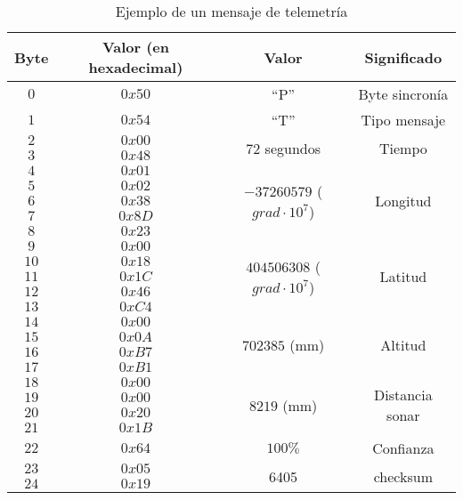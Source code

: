 \begin{table}
	\centering
	\caption{Ejemplo de un mensaje de telemetría}
	\begin{tabular}{|c|c|c|c|}\hline
		\textbf{Byte} 	&	\textbf{Valor (en hexadecimal)}	&\textbf{Valor}	&\textbf{Significado} \\ \hline \hline
		$0$ 			&  $0x50$			& ``P''	& Byte sincronía	\\ \hline
		$1$				&  $0x54$			& ``T''	& Tipo mensaje		\\ \hline
		$2$				&  $0x00$			& \multirow{2}{*}{$72$ segundos} & \multirow{2}{*}{Tiempo} \\
		$3$				&  $0x48$			&  & \\ \hline	
		$4$				&  $0x01$			&  \multirow{5}{*}{$-37260579$ ($grad \cdot 10^{7}$) } &  \multirow{5}{*}{Longitud}  \\
		$5$				&  $0x02$			&  &   \\ 	
		$6$				&  $0x38$			&  &    \\ 	
		$7$				&  $0x8D$			&  &    \\ 	
		$8$				&  $0x23$			&   &   \\ \hline
		$9$				&  $0x00$			& \multirow{5}{*}{$404506308$ ($grad \cdot 10^{7}$) } &  \multirow{5}{*}{Latitud}   \\
		$10$				&  $0x18$			&  &     \\ 	
		$11$				&  $0x1C$			&  &      \\ 	
		$12$				&  $0x46$			&  &      \\ 	
		$13$				&  $0xC4$			&  &      \\ \hline
		$14$				&  $0x00$			& \multirow{4}{*}{$702385$ (mm) } & \multirow{4}{*}{Altitud}\\
		$15$				&  $0x0A$			&   &     \\ 	
		$16$				&  $0xB7$			&   &         \\ 	
		$17$				&  $0xB1$			&   &        \\ \hline
		$18$				&  $0x00$			& \multirow{4}{*}{$8219$ (mm) } & \multirow{4}{*}{Distancia sonar}\\
		$19$				&  $0x00$			&     &     \\ 	
		$20$				&  $0x20$			&     &     \\ 	
		$21$				&  $0x1B$			&     &     \\ 	\hline
		$22$				&  $0x64$			& $100 \%$ &     Confianza \\ \hline
		$23$				&  $0x05$			&  \multirow{2}{*}{6405}	& \multirow{2}{*}{checksum} \\
		$24$				&  $0x19$			&     &     \\ \hline	
		
		
	\end{tabular}
	\label{tab:3}
\end{table}


